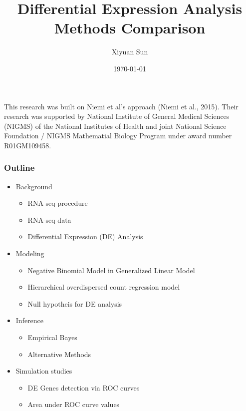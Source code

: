 \documentclass[handout,10pt]{beamer}
\institute[ISU]{Iowa State University}
\date{\today}
\title[Empirical Bayesian Method vs. Other Methods]{Differential Expression Analysis Methods Comparison}
\author{Xiyuan Sun}
\begin{document}


\begin{frame}
\maketitle



\vspace{0.2in} 

{\tiny
This research was built on Niemi et al's approach (Niemi et al., 2015). Their research was supported by National Institute of General Medical Sciences (NIGMS) of the National Institutes of Health and joint National Science Foundation / NIGMS Mathematial Biology Program under award number R01GM109458. 
}

\end{frame}





\begin{frame}
\frametitle{Outline}

\begin{itemize}
\item Background
	\begin{itemize}
	\item RNA-seq procedure
	\item RNA-seq data
	\item Differential Expression (DE) Analysis
	\end{itemize}
\item Modeling 
	\begin{itemize}
	\item Negative Binomial Model in Generalized Linear Model 
	\item Hierarchical overdispersed count regression model 
	\item Null hypotheis for DE analysis
	\end{itemize}
\item Inference
	\begin{itemize}
	\item Empirical Bayes
	\item Alternative Methods
	\end{itemize}
\item Simulation studies
	\begin{itemize}
	\item DE Genes detection via ROC curves
	\item Area under ROC curve values
	\end{itemize}
\end{itemize}

\end{frame}
\end{document}
